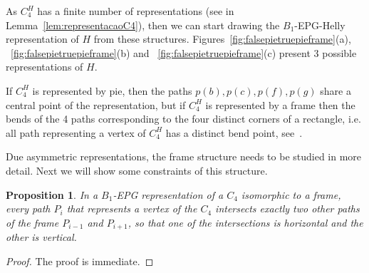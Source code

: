 \documentclass[preprint,12pt]{elsarticle} %
\newtheorem{prop}[theorem]{Proposition}
\begin{document}
As $C_4^{H}$ has a finite number of representations (see in Lemma~\ref{lem:representacaoC4}), then we can start drawing the $B_{1}$-EPG-Helly representation of $H$ from these structures.  Figures~\ref{fig:falsepietruepieframe}(a), ~\ref{fig:falsepietruepieframe}(b) and ~\ref{fig:falsepietruepieframe}(c) present 3 possible representations of $H$.


If $C_4^{H}$ is represented by pie, then the paths $p(b), p(c), p(f), p(g)$ share a central point of the representation, but if $C_4^{H}$ is represented by a frame then the bends of the 4 paths corresponding to the four distinct corners of a rectangle, i.e. all path representing a vertex of $C_4^{H}$ has a distinct bend point, see~\citep{golumbic2009}.



Due asymmetric representations, the frame structure needs to be studied in more detail. Next we will show some constraints of this structure. %

\begin{prop}\label{lem:direcoesdiferentes}
In a $B_1$-EPG representation of a $C_4$ isomorphic to a frame, every path $P_i$ that represents a vertex of the $C_4$ intersects exactly two other paths of the frame $P_{i-1}$ and $P_{i+1}$, so that one of the intersections is horizontal and the other is vertical. %
\end{prop}

\begin{proof}
The proof is immediate.
\end{proof}
\end{document}
